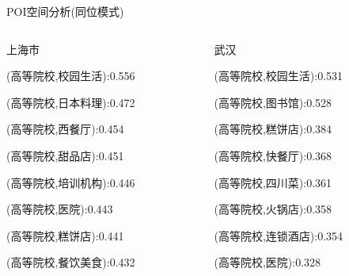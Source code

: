 \begin{frame}[c]{POI空间分析(同位模式)}
    \scriptsize
    \begin{columns}
        \begin{column}{0.333 \textwidth}
        \alert{上海市}

        \vspace{1em}
        (高等院校,校园生活):0.556

        \vspace{1em}
        (高等院校,日本料理):0.472

        \vspace{1em}
        (高等院校,西餐厅):0.454
        \vspace{1em}

        (高等院校,甜品店):0.451
        \vspace{1em}

        (高等院校,培训机构):0.446
        \vspace{1em}

        (高等院校,医院):0.443
        \vspace{1em}

        (高等院校,糕饼店):0.441
        \vspace{1em}

        (高等院校,餐饮美食):0.432
        \end{column}

        \begin{column}{0.333 \textwidth}
        \alert{武汉}
        \vspace{1em}

        (高等院校,校园生活):0.531
        \vspace{1em}

        (高等院校,图书馆):0.528
        \vspace{1em}

        (高等院校,糕饼店):0.384
        \vspace{1em}

        (高等院校,快餐厅):0.368
        \vspace{1em}

        (高等院校,四川菜):0.361
        \vspace{1em}

        (高等院校,火锅店):0.358 
        \vspace{1em}

        (高等院校,连锁酒店):0.354
        \vspace{1em}

        (高等院校,医院):0.328
        \end{column}


\end{columns}
\end{frame}
